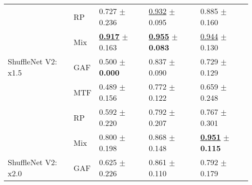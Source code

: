\begin{tabular}{lllll}
 & RP & \textcolor[rgb]{0.4266211604,0.5000000000,0}{0.727} $\pm$ \textcolor[rgb]{0.9474755531,0.0525244469,0}{0.236} & \underline{\textcolor[rgb]{0.0886469673,0.5000000000,0}{0.932}} $\pm$ \textcolor[rgb]{0.0836404647,0.5000000000,0}{0.095} & \textcolor[rgb]{0.2045009785,0.5000000000,0}{0.885} $\pm$ \textcolor[rgb]{0.1862448196,0.5000000000,0}{0.160} \\
 & Mix & \underline{\textbf{\textcolor[rgb]{0.0000000000,0.5000000000,0}{0.917}}} $\pm$ \textcolor[rgb]{0.6538202475,0.3461797525,0}{0.163} & \underline{\textbf{\textcolor[rgb]{0.0000000000,0.5000000000,0}{0.955}}} $\pm$ \textbf{\textcolor[rgb]{0.0000000000,0.5000000000,0}{0.083}} & \underline{\textcolor[rgb]{0.0215264188,0.5000000000,0}{0.944}} $\pm$ \textcolor[rgb]{0.0609939296,0.5000000000,0}{0.130} \\
ShuffleNet V2: x1.5 & GAF & \textcolor[rgb]{0.9385665529,0.0614334471,0}{0.500} $\pm$ \textbf{\textcolor[rgb]{0.0000000000,0.5000000000,0}{0.000}} & \textcolor[rgb]{0.4603421462,0.5000000000,0}{0.837} $\pm$ \textcolor[rgb]{0.0445462134,0.5000000000,0}{0.090} & \textcolor[rgb]{0.6888454012,0.3111545988,0}{0.729} $\pm$ \textcolor[rgb]{0.0568103794,0.5000000000,0}{0.129} \\
 & MTF & \textcolor[rgb]{0.9635949943,0.0364050057,0}{0.489} $\pm$ \textcolor[rgb]{0.6279873475,0.3720126525,0}{0.156} & \textcolor[rgb]{0.7166407465,0.2833592535,0}{0.772} $\pm$ \textcolor[rgb]{0.2659333763,0.5000000000,0}{0.122} & \textcolor[rgb]{0.9060665362,0.0939334638,0}{0.659} $\pm$ \textcolor[rgb]{0.5490881212,0.4509118788,0}{0.248} \\
 & RP & \textcolor[rgb]{0.7320819113,0.2679180887,0}{0.592} $\pm$ \textcolor[rgb]{0.8848167965,0.1151832035,0}{0.220} & \textcolor[rgb]{0.6376360809,0.3623639191,0}{0.792} $\pm$ \textcolor[rgb]{0.8451766078,0.1548233922,0}{0.207} & \textcolor[rgb]{0.5726027397,0.4273972603,0}{0.767} $\pm$ \textcolor[rgb]{0.7659479182,0.2340520818,0}{0.301} \\
 & Mix & \textcolor[rgb]{0.2627986348,0.5000000000,0}{0.800} $\pm$ \textcolor[rgb]{0.7938696415,0.2061303585,0}{0.198} & \textcolor[rgb]{0.3405909798,0.5000000000,0}{0.868} $\pm$ \textcolor[rgb]{0.4439252882,0.5000000000,0}{0.148} & \underline{\textbf{\textcolor[rgb]{0.0000000000,0.5000000000,0}{0.951}}} $\pm$ \textbf{\textcolor[rgb]{0.0000000000,0.5000000000,0}{0.115}} \\
ShuffleNet V2: x2.0 & GAF & \textcolor[rgb]{0.6569965870,0.3430034130,0}{0.625} $\pm$ \textcolor[rgb]{0.9079798901,0.0920201099,0}{0.226} & \textcolor[rgb]{0.3670295490,0.5000000000,0}{0.861} $\pm$ \textcolor[rgb]{0.1853579081,0.5000000000,0}{0.110} & \textcolor[rgb]{0.4951076321,0.5000000000,0}{0.792} $\pm$ \textcolor[rgb]{0.2652475447,0.5000000000,0}{0.179} \\

\end{tabular}
